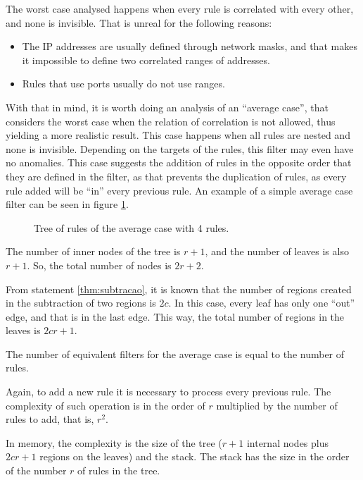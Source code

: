 The worst case analysed happens when every rule is correlated with every other,
and none is invisible. That is unreal for the following reasons:

\begin{itemize}
	\item The IP addresses are usually defined through network masks, and that
		makes it impossible to define two correlated ranges of addresses.
	\item Rules that use ports usually do not use ranges.
\end{itemize}

With that in mind, it is worth doing an analysis of an ``average case'', that
considers the worst case when the relation of correlation is not allowed, thus
yielding a more realistic result.
This case happens when all rules are nested and none
is invisible. Depending on the targets of the rules, this filter may even have
no anomalies.
This case suggests the addition of rules in the opposite order that they are
defined in the filter, as that prevents the duplication of rules, as every rule
added will be ``in'' every previous rule. An example of a simple average case
filter can be seen in figure
\ref{fig:mediocaso4arvore}.

\begin{figure}
	\centering
	\caption{\label{fig:mediocaso4arvore}Tree of rules of the average case with
	4 rules.}
\end{figure}

The number of inner nodes of the tree is $r+1$, and the number of leaves is also
$r+1$. So, the total number of nodes is $2r+2$.

From statement \ref{thm:subtracao}, it is known that the number of regions
created in the subtraction of two regions is $2c$. In this case, every leaf
has only one ``out'' edge, and that is in the last edge. This way, the total number
of regions in the leaves is $2cr+1$.

\begin{mathstatement}
	The number of equivalent filters for the average case is equal to the number
	of rules.
\end{mathstatement}

Again, to add a new rule it is necessary to process every previous rule. The
complexity of such operation is in the order of $r$ multiplied by the number of
rules to add, that is, $r^2$.

In memory, the complexity is the size of the tree ($r+1$ internal nodes plus
$2cr+1$ regions on the leaves) and the stack. The stack has the size in the
order of the number $r$ of rules in the tree.

